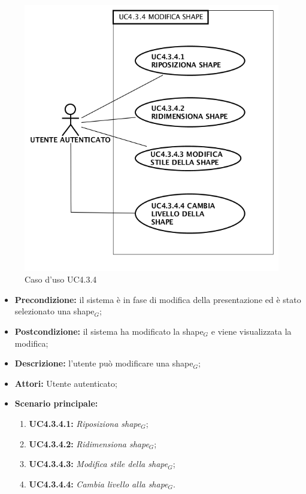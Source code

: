 \begin{figure}[h]
	\begin{center}
	\includegraphics[scale=0.4]{diagram/UC4-3-4.png}
	\caption{Caso d'uso UC4.3.4}
	\end{center}
\end{figure}
\begin{itemize}
	\item \textbf{Precondizione:} il sistema è in fase di modifica della presentazione ed è stato selezionato una shape$_G$;
	\item \textbf{Postcondizione:} il sistema ha modificato la shape$_G$ e viene visualizzata la modifica;
	\item \textbf{Descrizione:} l'utente può modificare una shape$_G$;
	\item \textbf{Attori:} Utente autenticato;
	\item \textbf{Scenario principale:}
	\begin{enumerate}
		\item \textbf{ UC4.3.4.1:} \textit{ Riposiziona shape$_G$};
		\item \textbf{ UC4.3.4.2:} \textit{ Ridimensiona shape$_G$};
		\item \textbf{ UC4.3.4.3:} \textit{ Modifica stile della shape$_G$};
		\item \textbf{ UC4.3.4.4:} \textit{ Cambia livello alla shape$_G$}.
	\end{enumerate}
\end{itemize}
